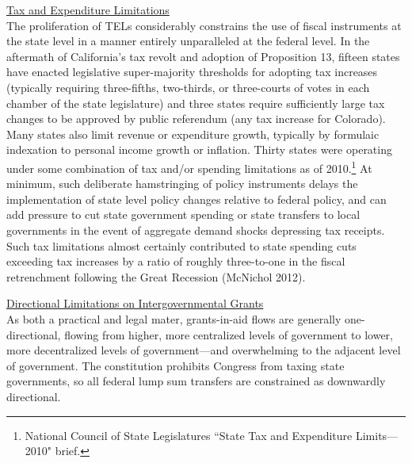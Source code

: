 \documentclass[12pt,letterpaper]{article}
\begin{document}
\smallskip

\noindent \underline{Tax and Expenditure Limitations} \smallskip \\
The proliferation of TELs considerably constrains the use of fiscal instruments at the state level in a manner entirely unparalleled at the  federal level. In the aftermath of California's tax revolt and adoption of Proposition 13, fifteen states have enacted legislative super-majority thresholds for adopting tax increases (typically requiring three-fifths, two-thirds, or three-courts of votes in each chamber of the state legislature) and three states require sufficiently large tax changes to be approved by public referendum (any tax increase for Colorado). Many states also limit revenue or expenditure growth, typically by formulaic indexation to personal income growth or inflation. Thirty states were operating under some combination of tax and/or spending limitations as of 2010.\footnote{National Council of State Legislatures ``State Tax and Expenditure Limits---2010" brief.} At minimum, such deliberate hamstringing of policy instruments delays the implementation of state level policy changes relative to federal policy, and can add pressure to cut state government spending or state transfers to local governments in the event of aggregate demand shocks depressing tax receipts. Such tax limitations almost certainly contributed to state spending cuts exceeding tax increases by a ratio of roughly three-to-one in the fiscal retrenchment following the Great Recession (McNichol 2012). \smallskip

\noindent \underline{Directional Limitations on Intergovernmental Grants} \smallskip \\
As both a practical and legal mater, grants-in-aid flows are generally one-directional, flowing from higher, more centralized levels of government to lower, more decentralized levels of government---and overwhelming to the adjacent level of government. The constitution prohibits Congress from taxing state governments, so all federal lump sum transfers are constrained as downwardly directional. 
\end{document}
